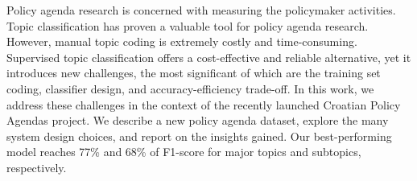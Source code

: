Policy agenda research is concerned with measuring the policymaker activities. Topic classification has proven a valuable tool for policy agenda research. However, manual topic coding is extremely costly and time-consuming. Supervised topic classification offers a cost-effective and reliable alternative, yet it introduces new challenges, the most significant of which are the training set coding, classifier design, and accuracy-efficiency trade-off.  In this work, we address these challenges in the context of the recently launched Croatian Policy Agendas project. We describe a new policy agenda dataset, explore the many system design choices, and report on the insights gained. Our best-performing model reaches 77\% and 68\% of F1-score for major topics and subtopics, respectively.

